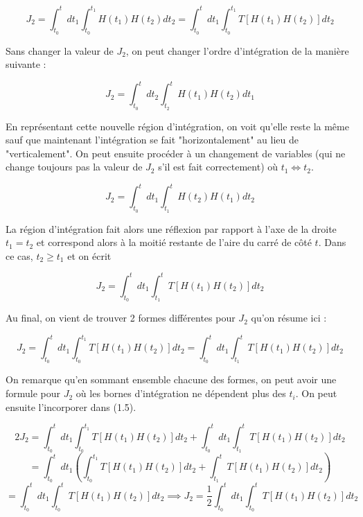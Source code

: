 \begin{equation*}
    J_2 = \int_{t_0}^{t}dt_1\int_{t_0}^{t_1}H(t_1)H(t_2)dt_2 = \int_{t_0}^{t}dt_1\int_{t_0}^{t_1}T\left[H(t_1)H(t_2)\right]dt_2
\end{equation*}

Sans changer la valeur de $J_2$, on peut changer l'ordre d'intégration de la manière suivante :

\begin{equation*}
    J_2 = \int_{t_0}^{t}dt_2\int_{t_2}^{t}H(t_1)H(t_2)dt_1
\end{equation*}

En représentant cette nouvelle région d'intégration, on voit qu'elle reste la même sauf que maintenant l'intégration se fait "horizontalement" au lieu de "verticalement". On peut ensuite procéder à un changement de variables (qui ne change toujours pas la valeur de $J_2$ s'il est fait correctement) où $t_1 \Leftrightarrow t_2$. 

\begin{equation*}
    J_2 = \int_{t_0}^{t}dt_1\int_{t_1}^{t}H(t_2)H(t_1)dt_2
\end{equation*}

La région d'intégration fait alors une réflexion par rapport à l'axe de la droite $t_1=t_2$ et correspond alors à la moitié restante de l'aire du carré de côté $t$. Dans ce cas, $t_2 \geq t_1$ et on écrit 

\begin{equation*}
    J_2 = \int_{t_0}^{t}dt_1\int_{t_1}^{t}T\left[H(t_1)H(t_2)\right]dt_2
\end{equation*}

Au final, on vient de trouver 2 formes différentes pour $J_2$ qu'on résume ici :

\begin{equation}
    J_2 = \int_{t_0}^{t}dt_1\int_{t_0}^{t_1}T\left[H(t_1)H(t_2)\right]dt_2 = \int_{t_0}^{t}dt_1\int_{t_1}^{t}T\left[H(t_1)H(t_2)\right]dt_2
\end{equation}

On remarque qu'en sommant ensemble chacune des formes, on peut avoir une formule pour $J_2$ où les bornes d'intégration ne dépendent plus des $t_i$. On peut ensuite l'incorporer dans (1.5).

\begin{equation*}
    2J_2 = \int_{t_0}^{t}dt_1\int_{t_0}^{t_1}T\left[H(t_1)H(t_2)\right]dt_2 + \int_{t_0}^{t}dt_1\int_{t_1}^{t}T\left[H(t_1)H(t_2)\right]dt_2
\end{equation*}
\begin{equation*}
    = \int_{t_0}^{t}dt_1\left(\int_{t_0}^{t_1}T\left[H(t_1)H(t_2)\right]dt_2 + \int_{t_1}^{t}T\left[H(t_1)H(t_2)\right]dt_2\right)
\end{equation*}
\begin{equation}
    = \int_{t_0}^{t}dt_1\int_{t_0}^{t}T\left[H(t_1)H(t_2)\right]dt_2 \implies J_2 = \frac{1}{2}\int_{t_0}^{t}dt_1\int_{t_0}^{t}T\left[H(t_1)H(t_2)\right]dt_2 
\end{equation}

